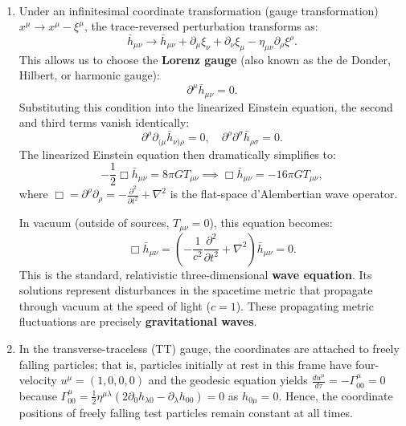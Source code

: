 \documentclass[12pt]{article}
\begin{document}
\vspace{1em}
\\
\begin{enumerate}[label=\alph*)]
\item Under an infinitesimal coordinate transformation (gauge transformation) $x^\mu \to x^\mu - \xi^\mu$, the trace-reversed perturbation transforms as:
\begin{equation}
\bar{h}_{\mu\nu} \to \bar{h}_{\mu\nu} + \partial_\mu \xi_\nu + \partial_\nu \xi_\mu - \eta_{\mu\nu} \partial_\rho \xi^\rho.
\end{equation}
This allows us to choose the \textbf{Lorenz gauge} (also known as the de Donder, Hilbert, or harmonic gauge):
\begin{equation}
\partial^\mu \bar{h}_{\mu\nu} = 0.
\end{equation}
Substituting this condition into the linearized Einstein equation, the second and third terms vanish identically:
\begin{equation}
\partial^\rho \partial_{(\mu} \bar{h}_{\nu)\rho} = 0, \quad \partial^\rho \partial^\sigma \bar{h}_{\rho\sigma} = 0.
\end{equation}
The linearized Einstein equation then dramatically simplifies to:
\begin{equation}
- \frac{1}{2} \Box \bar{h}_{\mu\nu} = 8\pi G T_{\mu\nu} \implies \Box \bar{h}_{\mu\nu} = - 16\pi G T_{\mu\nu},
\end{equation}
where $\Box = \partial^\rho \partial_\rho = -\frac{\partial^2}{\partial t^2} + \nabla^2$ is the flat-space d'Alembertian wave operator.

In vacuum (outside of sources, $T_{\mu\nu} = 0$), this equation becomes:
\begin{equation}
\Box \bar{h}_{\mu\nu} = \left(-\frac{1}{c^2}\frac{\partial^2}{\partial t^2} + \nabla^2\right) \bar{h}_{\mu\nu} = 0.
\end{equation}
This is the standard, relativistic three-dimensional \textbf{wave equation}. Its solutions represent disturbances in the spacetime metric that propagate through vacuum at the speed of light ($c=1$). These propagating metric fluctuations are precisely \textbf{gravitational waves}.

\item In the transverse-traceless (TT) gauge, the coordinates are attached to freely falling particles; that is, particles initially at rest in this frame have four-velocity $u^\mu = (1, 0, 0, 0)$ and the geodesic equation yields $\frac{du^\mu}{d\tau} = - \Gamma^\mu_{00} = 0$ because $\Gamma^\mu_{00} = \frac{1}{2}\eta^{\mu\lambda}(2\partial_0 h_{\lambda 0} - \partial_\lambda h_{00}) = 0$ as $h_{0\mu} = 0$. Hence, the coordinate positions of freely falling test particles remain constant at all times.


\end{enumerate}
\end{document}
